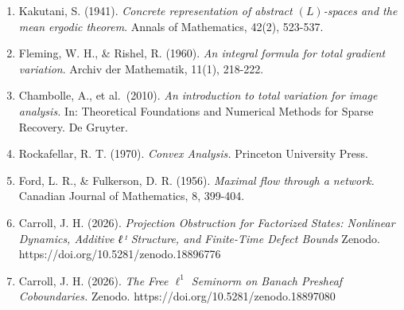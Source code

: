 \documentclass[
]{article}
\providecommand{\tightlist}{%
  \setlength{\itemsep}{0pt}\setlength{\parskip}{0pt}}
\begin{document}
\begin{enumerate}
\def\labelenumi{\arabic{enumi}.}
\tightlist
\item
  Kakutani, S. (1941). \emph{Concrete representation of abstract
  \((L)\)-spaces and the mean ergodic theorem}. Annals of Mathematics,
  42(2), 523-537.
\item
  Fleming, W. H., \& Rishel, R. (1960). \emph{An integral formula for
  total gradient variation}. Archiv der Mathematik, 11(1), 218-222.
\item
  Chambolle, A., et al.~(2010). \emph{An introduction to total variation
  for image analysis.} In: Theoretical Foundations and Numerical Methods
  for Sparse Recovery. De Gruyter.
\item
  Rockafellar, R. T. (1970). \emph{Convex Analysis.} Princeton
  University Press.
\item
  Ford, L. R., \& Fulkerson, D. R. (1956). \emph{Maximal flow through a
  network.} Canadian Journal of Mathematics, 8, 399-404.
\item
  Carroll, J. H. (2026). \emph{Projection Obstruction for Factorized
  States: Nonlinear Dynamics, Additive ℓ¹ Structure, and Finite-Time
  Defect Bounds} Zenodo. https://doi.org/10.5281/zenodo.18896776
\item
  Carroll, J. H. (2026). \emph{The Free \(\ell^1\) Seminorm on Banach
  Presheaf Coboundaries.} Zenodo.
  https://doi.org/10.5281/zenodo.18897080
\end{enumerate}
\end{document}
